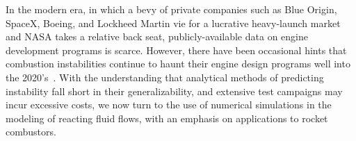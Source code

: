 
In the modern era, in which a bevy of private companies such as Blue Origin, SpaceX, Boeing, and Lockheed Martin vie for a lucrative heavy-launch market and NASA takes a relative back seat, publicly-available data on engine development programs is scarce. However, there have been occasional hints that combustion instabilities continue to haunt their engine design programs well into the 2020's~\cite{blueOriginTweet}. With the understanding that analytical methods of predicting instability fall short in their generalizability, and extensive test campaigns may incur excessive costs, we now turn to the use of numerical simulations in the modeling of reacting fluid flows, with an emphasis on applications to rocket combustors.
